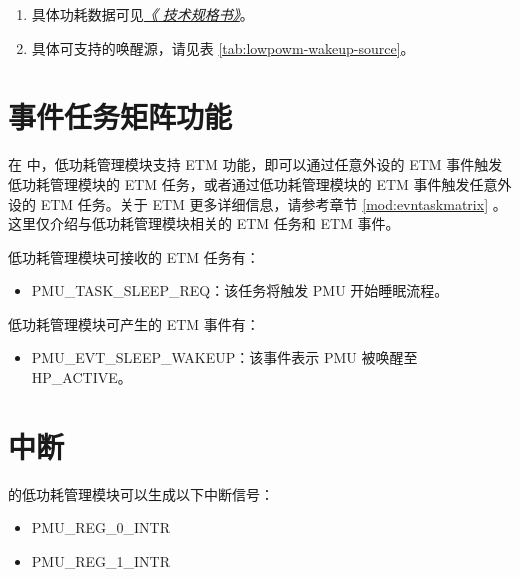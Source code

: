 \documentclass[main\_\_CN.tex]{subfiles}
\begin{document}
\begin{tiplisting}
\vspace{-2em}
\label{other:lowpowm-predefined-modes-notes}
\begin{enumerate}
\item 具体功耗数据可见\href{https://www.espressif.com/sites/default/files/documentation/esp32-p4_datasheet_cn.pdf}{\it{《\chipname{} 技术规格书》}}。
\item 具体可支持的唤醒源，请见表 \ref{tab:lowpowm-wakeup-source}。
\end{enumerate}
\end{tiplisting}


\section{事件任务矩阵功能} \label{sec:lowpowm-etm-func}

在 \chipname{} 中，低功耗管理模块支持 ETM 功能，即可以通过任意外设的 ETM 事件触发低功耗管理模块的 ETM 任务，或者通过低功耗管理模块的 ETM 事件触发任意外设的 ETM 任务。关于 ETM 更多详细信息，请参考章节 \ref{mod:evntaskmatrix} \textit{}。这里仅介绍与低功耗管理模块相关的 ETM 任务和 ETM 事件。

低功耗管理模块可接收的 ETM 任务有：

\begin{itemize}
\item PMU\_TASK\_SLEEP\_REQ：该任务将触发 PMU 开始睡眠流程。
\end{itemize}

低功耗管理模块可产生的 ETM 事件有：

\begin{itemize}
\item PMU\_EVT\_SLEEP\_WAKEUP：该事件表示 PMU 被唤醒至 HP\_ACTIVE。
\end{itemize}



\section{中断}

\chipname{} 的低功耗管理模块可以生成以下中断信号：

\begin{itemize}
\item PMU\_REG\_0\_INTR
\item PMU\_REG\_1\_INTR
\end{itemize}
\end{document}
